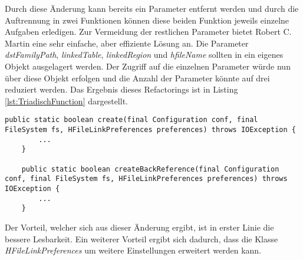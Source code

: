\SuperPar Durch diese Änderung kann bereits ein Parameter entfernt werden und durch die Auftrennung in zwei Funktionen können diese beiden Funktion jeweils einzelne Aufgaben erledigen. Zur Vermeidung der restlichen Parameter bietet Robert C. Martin eine sehr einfache, aber effiziente Lösung an. Die Parameter \textit{dstFamilyPath}, \textit{linkedTable}, \textit{linkedRegion} und \textit{hfileName} sollten in ein eigenes Objekt ausgelagert werden. Der Zugriff auf die einzelnen Parameter würde nun über diese Objekt erfolgen und die Anzahl der Parameter könnte auf drei reduziert werden. Das Ergebnis dieses Refactorings ist in Listing \ref{lst:TriadischFunction} dargestellt.

\begin{lstlisting}[language={[Sharp]C}, caption=Beispiel für Triadische Funktion, label=lst:TriadischFunction]
   public static boolean create(final Configuration conf, final FileSystem fs, HFileLinkPreferences preferences) throws IOException {
		...
	}
	
	public static boolean createBackReference(final Configuration conf, final FileSystem fs, HFileLinkPreferences preferences) throws IOException {
		...
	}
\end{lstlisting}

\SuperPar Der Vorteil, welcher sich aus dieser Änderung ergibt, ist in erster Linie die bessere Lesbarkeit. Ein weiterer Vorteil ergibt sich dadurch, dass die Klasse \textit{HFileLinkPreferences} um weitere Einstellungen erweitert werden kann. 